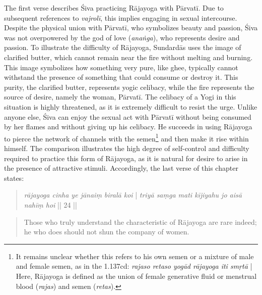 The first verse describes Śiva practicing Rājayoga with Pārvatī. Due to subsequent references to \textit{vajrolī}, this implies engaging in sexual intercourse. Despite the physical union with Pārvatī, who symbolizes beauty and passion, Śiva was not overpowered by the god of love (\textit{anaṅga}), who represents desire and passion. To illustrate the difficulty of Rājayoga, Sundardās uses the image of clarified butter, which cannot remain near the fire without melting and burning. This image symbolizes how something very pure, like ghee, typically cannot withstand the presence of something that could consume or destroy it. This purity, the clarified butter, represents yogic celibacy, while the fire represents the source of desire, namely the woman, Pārvatī. The celibacy of a Yogi in this situation is highly threatened, as it is extremely difficult to resist the urge. Unlike anyone else, Śiva can enjoy the sexual act with Pārvatī without being consumed by her flames and without giving up his celibacy. He succeeds in using Rājayoga to pierce the network of channels with the semen\footnote{It remains unclear whether this refers to his own semen or a mixture of male and female semen, as in the  1.137cd: \textit{rajaso retaso yogād rājayoga iti smṛtā} | Here, Rājayoga is defined as the union of female generative fluid or menstrual blood (\textit{rajas}) and semen (\textit{retas}).} and then make it rise within himself. The comparison illustrates the high degree of self-control and difficulty required to practice this form of Rājayoga, as it is natural for desire to arise in the presence of attractive stimuli. Accordingly, the last verse of this chapter states:

\begin{quote}
  \textit{rājayoga cinha ye jānaiṃ biralā koi} |
  \textit{triyā saṃga mati kījiyahu jo aisā nahīṃ hoi} || 24 ||
\end{quote}
\begin{quote}
Those who truly understand the characteristic of Rājayoga are rare indeed; he who does should not shun the company of women. 
\end{quote}

